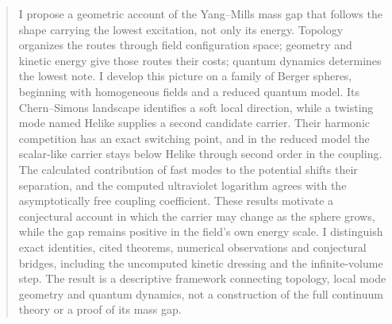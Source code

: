 \begin{abstract}
I propose a geometric account of the Yang--Mills mass gap that follows the shape carrying the lowest excitation,
not only its energy. Topology organizes the routes through field configuration space; geometry and kinetic energy
give those routes their costs; quantum dynamics determines the lowest note. I develop this picture on a family of
Berger spheres, beginning with homogeneous fields and a reduced quantum model. Its Chern--Simons landscape identifies
a soft local direction, while a twisting mode named Helike supplies a second candidate carrier. Their harmonic
competition has an exact switching point, and in the reduced model the scalar-like carrier stays below Helike
through second order in the coupling. The calculated contribution of fast modes to the potential shifts their
separation, and the computed ultraviolet logarithm agrees with the asymptotically free coupling coefficient.
These results motivate a conjectural account in which the carrier may change as the sphere grows, while the gap
remains positive in the field's own energy scale. I distinguish exact identities, cited theorems, numerical
observations and conjectural bridges, including the uncomputed kinetic dressing and the infinite-volume step.
The result is a descriptive framework connecting topology, local mode geometry and quantum dynamics, not a
construction of the full continuum theory or a proof of its mass gap.
\end{abstract}
